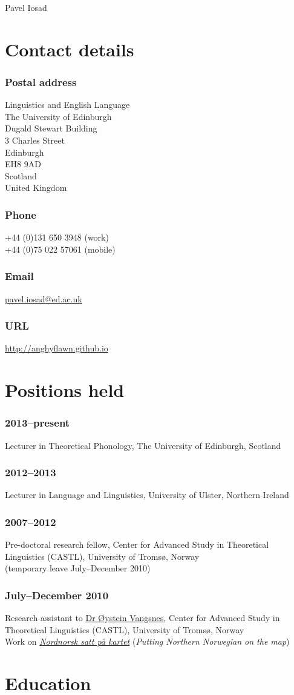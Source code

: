\documentclass[a4paper,12pt]{article}
\newlength\blockwidth
\newcommand\cvitem[1]{\hspace*{\blockwidth}\begin{minipage}[t]{\linewidth-\blockwidth}
#1
\end{minipage}\par}
\newcommand{\block}[2]{\subsubsection{#1}\cvitem{#2}}
\begin{document}
\thispagestyle{plain}
{\Huge Pavel Iosad}\\[\baselineskip]

\section{Contact details}

\raggedcolumns

\begin{multicols}{2}
\block{Postal address}{Linguistics and English Language\\
The University of Edinburgh\\
Dugald Stewart Building\\
3 Charles Street\\
Edinburgh\\
EH8 9AD\\
Scotland\\
United Kingdom}
\block{Phone}{+44 (0)131 650 3948 (work)\\
+44 (0)75 022 57061 (mobile)}
\block{Email}{\href{mailto:pavel.iosad@ed.ac.uk}{pavel.iosad@ed.ac.uk}}
\block{URL}{\href{http://anghyflawn.github.io}{http://anghyflawn.github.io}}
\end{multicols}

\section{Positions held}
\block{2013--present}{Lecturer in Theoretical Phonology, The University of Edinburgh, Scotland}
\block{2012--2013}{Lecturer in Language and Linguistics, University of Ulster, Northern Ireland}
\block{2007--2012}{Pre-doctoral research fellow, Center for Advanced Study in Theoretical Linguistics (CASTL), University of Tromsø, Norway\\
(temporary leave July--December 2010)}
\block{July--December 2010}{Research assistant to \href{http://www.hum.uit.no/a/vangsnes}{Dr Øystein Vangsnes}, Center for Advanced Study in Theoretical Linguistics (CASTL), University of Tromsø, Norway\\
Work on \href{http://nordnorsk.uit.no/}{\textit{Nordnorsk satt på kartet}} (\textit{Putting Northern Norwegian on the map})}

\section{Education}
\end{document}
